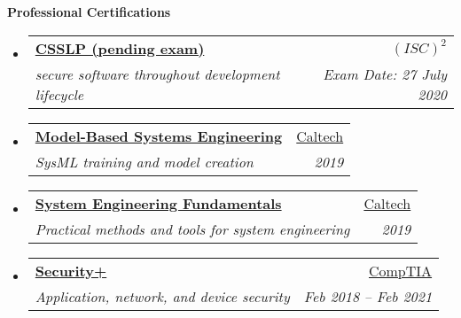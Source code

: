 \documentclass[letterpaper,11pt]{article}
\makeatletter
\newcommand{\resheading}[1]{{\large \textbf{#1}}}
\newcommand{\ressubheading}[4]{
\begin{tabular*}{6.5in}{l@{\extracolsep{\fill}}r}
		\textbf{#1} & #2 \\
		\textit{#3} & \textit{#4} \\
\end{tabular*}\vspace{-6pt}}
\makeatother
\begin{document}
\resheading{Professional Certifications}
\begin{itemize}
    \item
        \ressubheading{\href{https://www.isc2.org/Certifications/CSSLP}{CSSLP (pending exam)}
        }{\href{https://www.isc2.org/}{$(ISC)^2$}
        }{secure software throughout development lifecycle
        }{Exam Date: 27 July 2020}
     \item
        \ressubheading{\href{https://ctme.caltech.edu/programs-for-individuals/advanced-engineering-open/model-based-systems-engineering-certificate-open}{Model-Based Systems Engineering}
        }{\href{https://ctme.caltech.edu/}{Caltech}
        }{SysML training and model creation
        }{2019}
      \item
        \ressubheading{\href{https://ctme.caltech.edu/programs-for-individuals/advanced-engineering-open/systems-engineering-fundamentals-open}{System Engineering Fundamentals}
        }{\href{https://ctme.caltech.edu/}{Caltech}
        }{Practical methods and tools for system engineering
        }{2019}
    \item
        \ressubheading{\href{https://certification.comptia.org/certifications/security}{Security+}
        }{\href{https://certification.comptia.org/home}{CompTIA}
        }{Application, network, and device security
        }{Feb 2018 -- Feb 2021}
\end{itemize}
~
\end{document}

